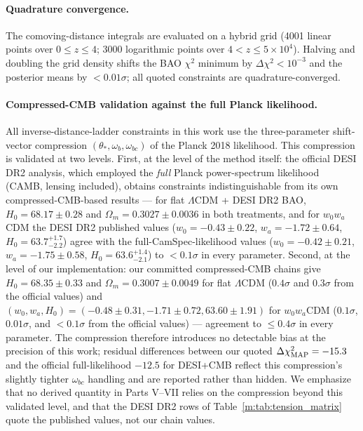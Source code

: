 \documentclass[aps,prd,preprint,superscriptaddress,nofootinbib]{revtex4-2}
\begin{document}
\paragraph{Quadrature convergence.} The comoving-distance integrals are evaluated on a hybrid grid (4001 linear points over $0 \le z \le 4$; 3000 logarithmic points over $4 < z \le 5\times10^4$). Halving and doubling the grid density shifts the BAO $\chi^2$ minimum by $\Delta\chi^2 < 10^{-3}$ and the posterior means by $< 0.01\sigma$; all quoted constraints are quadrature-converged.

\paragraph{Compressed-CMB validation against the full Planck likelihood.} All inverse-distance-ladder constraints in this work use the three-parameter shift-vector compression $(\theta_*, \omega_b, \omega_{bc})$ of the Planck 2018 likelihood. This compression is validated at two levels. First, at the level of the method itself: the official DESI DR2 analysis, which employed the \emph{full} Planck power-spectrum likelihood (CAMB, lensing included), obtains constraints indistinguishable from its own compressed-CMB-based results --- for flat $\Lambda$CDM + DESI DR2 BAO, $H_0 = 68.17 \pm 0.28$ and $\Omega_m = 0.3027 \pm 0.0036$ in both treatments, and for $w_0w_a$CDM the DESI DR2 published values ($w_0 = -0.43 \pm 0.22$, $w_a = -1.72 \pm 0.64$, $H_0 = 63.7^{+1.7}_{-2.2}$) agree with the full-CamSpec-likelihood values ($w_0 = -0.42 \pm 0.21$, $w_a = -1.75 \pm 0.58$, $H_0 = 63.6^{+1.4}_{-2.1}$) to $< 0.1\sigma$ in every parameter. Second, at the level of our implementation: our committed compressed-CMB chains give $H_0 = 68.35 \pm 0.33$ and $\Omega_m = 0.3007 \pm 0.0049$ for flat $\Lambda$CDM ($0.4\sigma$ and $0.3\sigma$ from the official values) and $(w_0, w_a, H_0) = (-0.48 \pm 0.31, -1.71 \pm 0.72, 63.60 \pm 1.91)$ for $w_0w_a$CDM ($0.1\sigma$, $0.01\sigma$, and $< 0.1\sigma$ from the official values) --- agreement to $\le 0.4\sigma$ in every parameter. The compression therefore introduces no detectable bias at the precision of this work; residual differences between our quoted $\Delta\chi^2_{\rm MAP} = -15.3$ and the official full-likelihood $-12.5$ for DESI+CMB reflect this compression's slightly tighter $\omega_{bc}$ handling and are reported rather than hidden. We emphasize that no derived quantity in Parts V--VII relies on the compression beyond this validated level, and that the DESI DR2 rows of Table~\ref{m:tab:tension_matrix} quote the published values, not our chain values.
\end{document}
